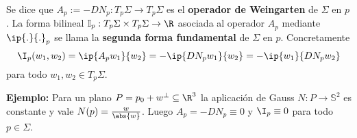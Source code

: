 \documentclass{article}
\begin{document}
\begin{dfn}
    Se dice que $A_{p}:=-DN_{p}:T_{p}\Sigma\to T_{p}\Sigma$ es el \textbf{operador de Weingarten}
    de $\Sigma$ en $p$. La forma bilineal $\mathbb{I}_{p}:T_{p}\Sigma\times T_{p}\Sigma\to\R$
    asociada al operador $A_{p}$ mediante $\ip{.}{.}_{p}$ se llama la \textbf{segunda forma 
    fundamental} de $\Sigma$ en $p$. Concretamente
    \begin{equation*}
        \I_{p}(w_{1},w_{2})=\ip{A_{p}w_{1}}{w_{2}}=-\ip{DN_{p}w_{1}}{w_{2}}=
        -\ip{w_{1}}{DN_{p}w_{2}}
    \end{equation*}
    para todo $w_{1},w_{2}\in T_{p}\Sigma$.
\end{dfn}

\noindent\textbf{Ejemplo:} Para un plano $P=p_{0}+w^{\perp}\subseteq\R^{3}$ la aplicación de Gauss
$N:P\to\mathbb{S}^{2}$ es constante y vale $N(p)=\frac{w}{\abs{w}}$. Luego $A_{p}=-DN_{p}\equiv0$
y $\I_{p}\equiv0$ para todo $p\in\Sigma$.

\end{document}
